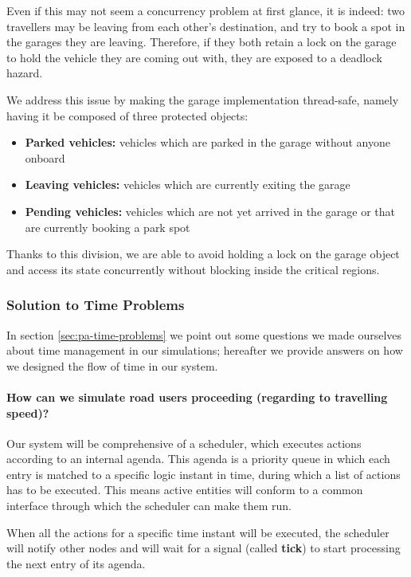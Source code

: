 Even if this may not seem a concurrency problem at first glance, it is indeed:
two travellers may be leaving from each other's destination, and try to book a
spot in the garages they are leaving.
Therefore, if they both retain a lock on the garage to hold the vehicle they
are coming out with, they are exposed to a deadlock hazard.

We address this issue by making the garage implementation thread-safe, namely
having it be composed of three protected objects:

\begin{itemize}
  \item \textbf{Parked vehicles:} vehicles which are parked in the garage
    without anyone onboard
  \item \textbf{Leaving vehicles:} vehicles which are currently exiting the
    garage
  \item \textbf{Pending vehicles:} vehicles which are not yet arrived in the
    garage or that are currently booking a park spot
\end{itemize}

Thanks to this division, we are able to avoid holding a lock on the garage
object and access its state concurrently without blocking inside the critical
regions.


\subsubsection{Solution to Time Problems}

In section \ref{sec:pa-time-problems} we point out some questions we made
ourselves about time management in our simulations; hereafter we provide
answers on how we designed the flow of time in our system.

\paragraph{How can we simulate road users proceeding (regarding to travelling
  speed)?}
Our system will be comprehensive of a scheduler, which executes actions
according to an internal agenda.
This agenda is a priority queue in which each entry is matched to a specific
logic instant in time, during which a list of actions has to be executed. This
means active entities will conform to a common interface through which the
scheduler can make them run.

When all the actions for a specific time instant will be executed, the
scheduler will notify other nodes and will wait for a signal (called
\textbf{tick}) to start processing the next entry of its agenda.

